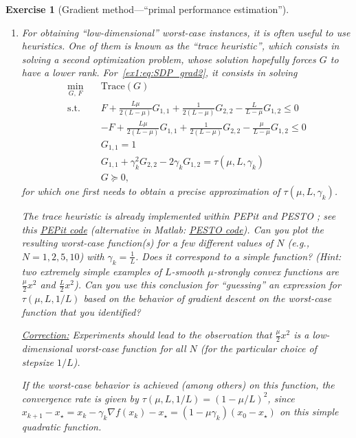 \documentclass[11pt,a4paper]{article}
\newcommand{\pesto}{{PESTO }}
\newcommand{\pepit}{{PEPit }}
\newcommand{\correction}[1]{{{\color{blue}\underline{Correction:} #1}}}
\newcommand{\correction}[1]{}
\newtheorem{exercise}{Exercise}
\begin{document}
\begin{exercise}[Gradient method---``primal performance estimation'']
\begin{enumerate}
	\item For obtaining ``low-dimensional'' worst-case instances, it is often useful to use heuristics. One of them is known as the ``trace heuristic'', which consists in solving a second optimization problem, whose solution hopefully forces $G$ to have a lower rank. For~\eqref{ex1:eq:SDP_grad2}, it consists in solving
	\begin{equation}\label{ex1:eq:trace}
	\begin{aligned}
				\min_{G,\, F} \quad & \mathrm{Trace}(G)\\
			\text{s.t. } \quad & F + \tfrac{L\mu}{2(L-\mu)} G_{1,1}+\tfrac{1}{2(L-\mu)}G_{2,2}-\tfrac{L}{L-\mu}G_{1,2}\leqslant 0\\
			&-F + \tfrac{L\mu}{2(L-\mu)} G_{1,1}+\tfrac{1}{2(L-\mu)}G_{2,2}-\tfrac{\mu}{L-\mu}G_{1,2}\leqslant 0\\
			&G_{1,1}= 1\\
			&G_{1,1}+\gamma_k ^2 G_{2,2}-2\gamma_k G_{1,2}=\tau(\mu,L,\gamma_k)\\
			&G\succcurlyeq 0,
	\end{aligned}
	\end{equation}
	for which one first needs to obtain a precise approximation of $\tau(\mu,L,\gamma_k)$. 
	
	The trace heuristic is already implemented within \pepit and \pesto; see this \href{https://github.com/PerformanceEstimation/Learning-Performance-Estimation/tree/main/Exercises - codes/Jupyter/Exercise1.ipynb}{\pepit code} (alternative in Matlab: \href{https://github.com/PerformanceEstimation/Learning-Performance-Estimation/blob/main/Exercises - codes/Matlab/Exercise1_dimReduction.m}{\pesto code}). Can you plot the resulting worst-case function(s) for a few different values of $N$ (e.g., $N=1,2,5,10$) with $\gamma_k=\tfrac{1}{L}$. Does it correspond to a simple function? (Hint: two extremely simple examples of $L$-smooth $\mu$-strongly convex functions are $\tfrac{\mu}{2}x^2$ and $\tfrac{L}{2}x^2$). Can you use this conclusion for ``guessing'' an expression for $\tau(\mu,L,1/L)$ based on the behavior of gradient descent on the worst-case function that you identified?
	
	\correction{Experiments should lead to the observation that $\tfrac{\mu}{2}x^2$ is a low-dimensional worst-case function for all $N$ (for the particular choice of stepsize $1/L$).
	
	If the worst-case behavior is achieved (among others) on this function, the convergence rate is given by $\tau(\mu,L,1/L)=(1-\mu/L)^2$, since $x_{k+1}-x_\star=x_k-\gamma_k \nabla f(x_k)-x_\star=(1-\mu\gamma_k)(x_0-x_\star)$ on this simple quadratic function.}


\end{enumerate}
\end{exercise}
\end{document}
